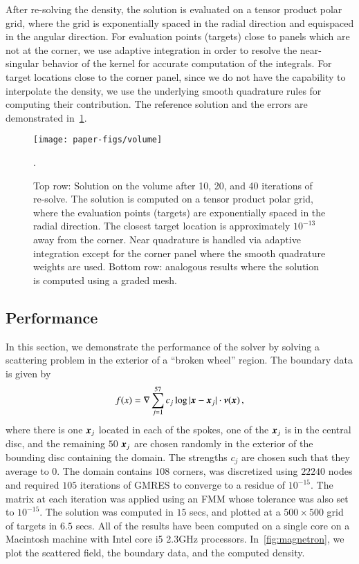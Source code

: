 After re-solving the density, the solution is evaluated on a tensor product polar grid, where the grid
is exponentially spaced in the radial direction and equispaced in the angular direction. For evaluation points (targets)
close to panels which are not at the corner, we use adaptive integration in order to resolve the near-singular behavior of
the kernel for accurate computation of the integrals. For target locations close to the corner panel, since we do not have
the capability to interpolate the density, we use the underlying smooth quadrature rules for computing their contribution. 
The reference solution and the errors are demonstrated in~\cref{fig:vol-plot}.
\begin{figure}
\begin{center}
\texttt{[image: paper-figs/volume]}
\caption{Top row: Solution on the volume after 10, 20, and 40 iterations of re-solve. The solution is computed on a tensor product polar grid, where the evaluation points (targets) are exponentially spaced in the radial direction. The closest target location is approximately $10^{-13}$ away from the corner. Near quadrature is handled via adaptive integration except for the corner panel where the smooth quadrature weights are used. Bottom row: analogous results where the solution is computed using a graded mesh.   }.
\label{fig:vol-plot}
\end{center}
\end{figure}


\subsection{Performance}
In this section, we demonstrate the performance of the solver by solving a scattering problem in the
exterior of a ``broken wheel'' region. The boundary data is given by
\begin{equation}
f(x) = \nabla  \sum_{j=1}^{57} c_{j} \log| \boldsymbol{x} - \boldsymbol{x}_{j}| \cdot \boldsymbol{\nu}(\boldsymbol{x}) \, , 
\end{equation}
where there is one $\boldsymbol{x}_{j}$ located in each of the spokes, one of the $\boldsymbol{x}_{j}$ is in the central disc, and the remaining $50$ $\boldsymbol{x}_{j}$ are chosen randomly in the exterior of the bounding disc containing the domain. The strengths $c_{j}$ are chosen such that they average to $0$. The domain contains $108$ corners, was discretized using $22240$ nodes and required $105$ iterations {\color{olive}of GMRES} to converge to a residue of $10^{-15}$. The matrix at each iteration was applied using an FMM whose tolerance was also set to $10^{-15}$. The solution was computed in $15$ secs, and plotted at a $500\times 500$ grid of targets in $6.5$ secs. All of the results have been computed on a single core on a Macintosh machine with Intel core i5 2.3GHz processors. In~\cref{fig:magnetron}, we plot the scattered field, the boundary data, and the computed density.


